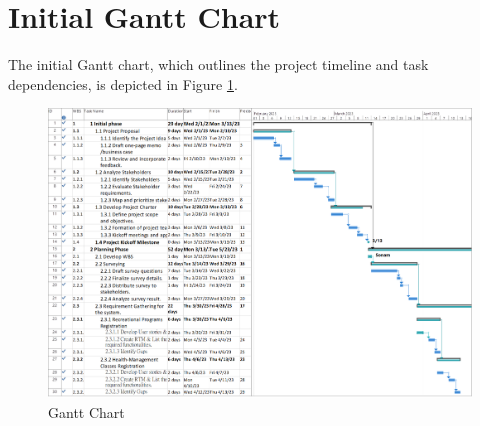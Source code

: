 \section{Initial Gantt Chart}

The initial Gantt chart, which outlines the project timeline and task dependencies, is depicted in Figure \ref{fig:gnt1}.

\begin{figure}[ht]
    \includegraphics[width=\textwidth]{images/gant.png}
    \caption{Gantt Chart}
    \label{fig:gnt1}
\end{figure}

\FloatBarrier
\newpage